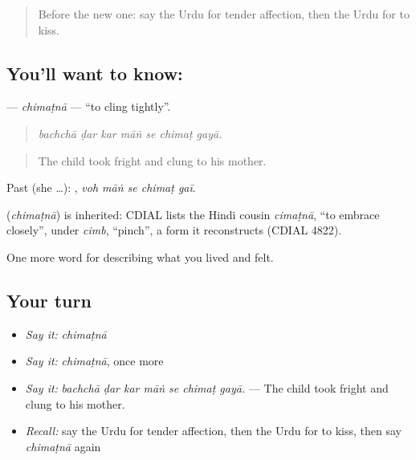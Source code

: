 \label{lesson:UR-C449-chimatna}



\begin{quote}
Before the new one: say the Urdu for tender affection, then the Urdu for to kiss.
\end{quote}

\subsection*{You'll want to know: }
\textbf{} — \emph{chimaṭnā} — \textquotedblleft{}to cling tightly\textquotedblright{}.

\begin{quote}
      
\end{quote}

\begin{quote}
\emph{bachchā ḍar kar māṅ se chimaṭ gayā.}
\end{quote}

\begin{quote}
The child took fright and clung to his mother.
\end{quote}

Past (she …):     , \emph{voh māṅ se chimaṭ gaī}.

\begin{cousinweb}
\textbf{} (\emph{chimaṭnā}) is inherited: CDIAL lists the Hindi cousin \emph{cimaṭnā}, \textquotedblleft{}to embrace closely\textquotedblright{}, under \emph{cimb}, \textquotedblleft{}pinch\textquotedblright{}, a form it reconstructs (CDIAL 4822).
\end{cousinweb}

\begin{grammarlens}[title={What you've built}]
One more word for describing what you lived and felt.
\end{grammarlens}

\subsection*{Your turn}
\begin{itemize}
\raggedright
  \item \emph{Say it:} \emph{chimaṭnā}
  \item \emph{Say it:} \emph{chimaṭnā}, once more
  \item \emph{Say it:} \emph{bachchā ḍar kar māṅ se chimaṭ gayā.} — The child took fright and clung to his mother.
  \item \emph{Recall:} say the Urdu for tender affection, then the Urdu for to kiss, then say \emph{chimaṭnā} again
\end{itemize}

